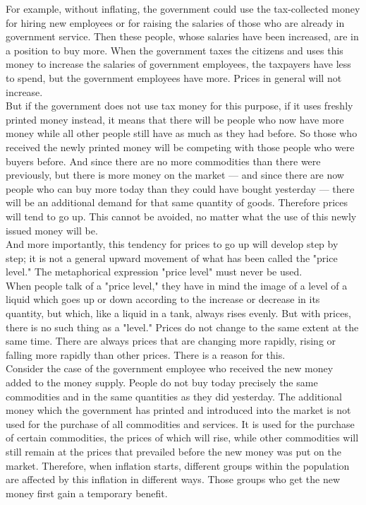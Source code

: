 \documentclass[a4paper]{article}
\begin{document}
For example, without inflating, the government could use the tax-collected 
money for hiring new employees or for raising the salaries of those who are 
already in government service. Then these people, whose salaries have been 
increased, are in a position to buy more. When the government taxes the 
citizens and uses this money to increase the salaries of government employees, 
the taxpayers have less to spend, but the government employees have more. 
Prices in general will not increase.\\

But if the government does not use tax money for this purpose, if it uses 
freshly printed money instead, it means that there will be people who now have 
more money while all other people still have as much as they had before. So 
those who received the newly printed money will be competing with those people 
who were buyers before. And since there are no more commodities than there were
previously, but there is more money on the market — and since there are now 
people who can buy more today than they could have bought yesterday — there 
will be an additional demand for that same quantity of goods. Therefore prices 
will tend to go up. This cannot be avoided, no matter what the use of this 
newly issued money will be.\\

And more importantly, this tendency for prices to go up will develop step by 
step; it is not a general upward movement of what has been called the "price 
level." The metaphorical expression "price level" must never be used.\\

When people talk of a "price level," they have in mind the image of a level of 
a liquid which goes up or down according to the increase or decrease in its 
quantity, but which, like a liquid in a tank, always rises evenly. But with 
prices, there is no such thing as a "level." Prices do not change to the same 
extent at the same time. There are always prices that are changing more 
rapidly, rising or falling more rapidly than other prices. There is a reason 
for this.\\

Consider the case of the government employee who received the new money added 
to the money supply. People do not buy today precisely the same commodities and
in the same quantities as they did yesterday. The additional money which the 
government has printed and introduced into the market is not used for the 
purchase of all commodities and services. It is used for the purchase of 
certain commodities, the prices of which will rise, while other commodities 
will still remain at the prices that prevailed before the new money was put on 
the market. Therefore, when inflation starts, different groups within the 
population are affected by this inflation in different ways. Those groups who 
get the new money first gain a temporary benefit.\\
\end{document}
